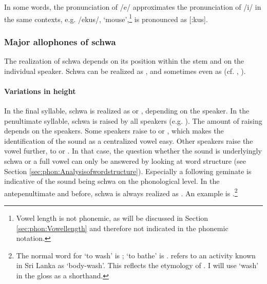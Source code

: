


 In  some words, the pronunciation of /e/ approximates the pronunciation of /i/ in the same contexts, e.g. /\dentt ekus/, `mouse',\footnote{Vowel length is not phonemic, as will be discussed in Section \ref{sec:phon:Vowellength} and therefore not indicated in the phonemic notation.}  is pronounced as [\dentt{}:kus].


\subsubsection{Major  allophones of schwa}\label{sec:phon:Majorallophonesofschwa}
The realization of schwa depends on its position within the stem and on the individual speaker. Schwa can be realized as , and sometimes even as  (cf. \citet[27f]{Adelaar1991}, \citet{SmithEtAl2004}).


\paragraph{Variations in height}
In the final syllable, schwa is realized as  or , depending on the speaker. In the penultimate syllable, schwa is raised by all speakers (e.g. ). The amount of raising depends on the speakers. Some speakers raise to  or , which makes the identification of the sound as a centralized vowel easy. Other speakers raise the vowel further, to  or . In that case, the question  whether the sound is underlyingly schwa or a full vowel can only be answered by looking at word structure (see Section \ref{sec:phon:Analysisofwordstructure}). Especially a following geminate is indicative of the sound being schwa on the phonological level. In the antepenultimate and before, schwa is always realized as . An example is .\footnote{The normal word for `to wash' is ; `to bathe' is .  refers to an activity known in Sri Lanka as `body-wash'. This reflects the etymology of . I will use `wash' in the gloss as a shorthand.}

